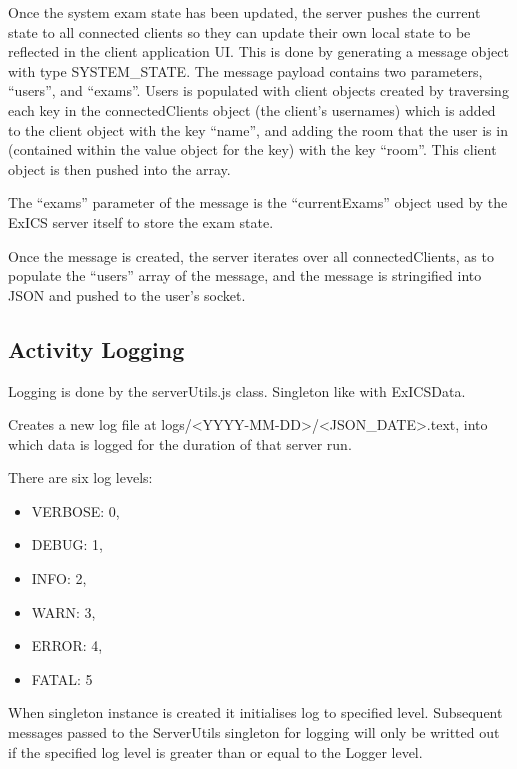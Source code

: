 Once the system exam state has been updated, the server pushes the current state to all connected clients so they can update their own local state to be reflected in the client application UI.  This is done by generating a message object with type SYSTEM\_STATE.  The message payload contains two parameters, ``users'', and ``exams''.  Users is populated with client objects created by traversing each key in the connectedClients object (the client's usernames) which is added to the client object with the key ``name'', and adding the room that the user is in (contained within the value object for the key) with the key ``room''.  This client object is then pushed into the array.

The ``exams'' parameter of the message is the ``currentExams'' object used by the ExICS server itself to store the exam state.

Once the message is created, the server iterates over all connectedClients, as to populate the ``users'' array of the message, and the message is stringified into JSON and pushed to the user's socket.

\subsection{Activity Logging}
\label{subs:exics_logging}

Logging is done by the serverUtils.js class.  Singleton like with ExICSData.

Creates a new log file at logs/\textless YYYY-MM-DD\textgreater/\textless JSON\_DATE\textgreater.text, into which data is logged for the duration of that server run.

There are six log levels:

\begin{itemize}

\item VERBOSE: 0,
\item DEBUG: 1,
\item INFO: 2,
\item WARN: 3,
\item ERROR: 4,
\item FATAL: 5

\end{itemize}

When singleton instance is created it initialises log to specified level.  Subsequent messages passed to the ServerUtils singleton for logging will only be writted out if the specified log level is greater than or equal to the Logger level.


